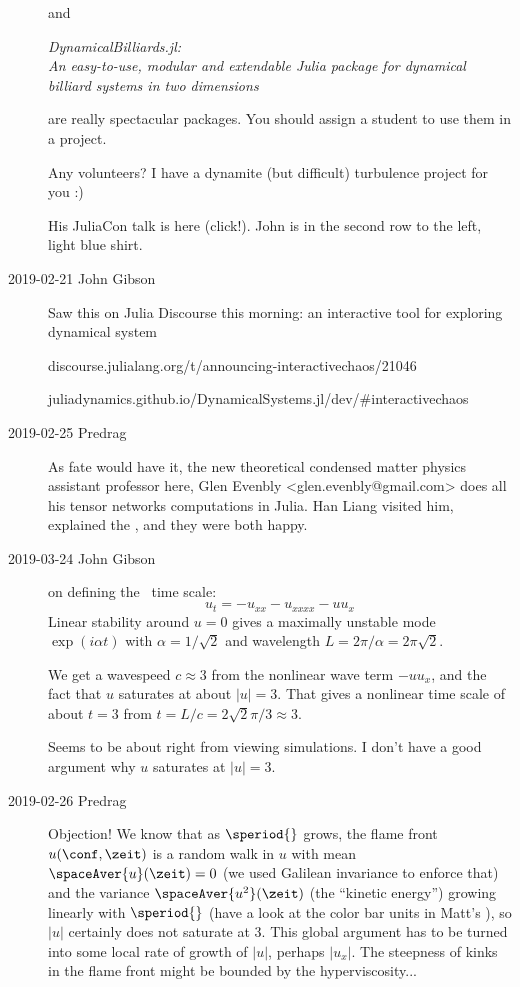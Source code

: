 \begin{description}
and

{\em {DynamicalBilliards}.jl:\\ An easy-to-use, modular and extendable {Julia}
package for dynamical billiard systems in two dimensions}

are really spectacular packages. You should assign a student to use them in a
project.

Any volunteers? I have a dynamite (but difficult) turbulence project for you :)

His JuliaCon talk is here
(click!).
John is in the second row to the left, light blue shirt.

    \item[2019-02-21 John Gibson]
Saw this on Julia Discourse this morning: an interactive tool for
exploring dynamical system

{discourse.julialang.org/t/announcing-interactivechaos/21046}

{juliadynamics.github.io/DynamicalSystems.jl/dev/\#interactivechaos}

    \item[2019-02-25 Predrag]
As fate would have it, the new theoretical condensed matter physics
assistant professor here,
 {Glen Evenbly}
<glen.evenbly@gmail.com>
does all his tensor networks computations in Julia. Han Liang
visited him, explained the \catlatt, and they were both happy.

    \item[2019-03-24 John Gibson] on defining the \KS\ time scale:
\[
u_t = - u_{xx} - u_{xxxx} - u u_x
\]
Linear stability around $u=0$ gives a maximally unstable mode
$\exp(i\alpha t)$ with $\alpha = 1/\sqrt{2}$ and
wavelength $L = 2\pi/\alpha = 2 \pi\sqrt{2}$.

We get a wavespeed $c \approx 3$ from the nonlinear wave term $-u u_x$,
and the fact that $u$ saturates at about $|u| = 3$.
That gives a nonlinear time scale of about $t=3$ from
$t = L/c = 2 \sqrt{2} \pi / 3 \approx 3$.

Seems to be about right from viewing simulations. I don't have a good
argument why $u$ saturates at  $|u| = 3$.

    \item[2019-02-26 Predrag]
Objection! We know that as $\speriod{}$ grows, the flame front
$u(\conf,\zeit)$ is a random walk in $u$ with mean
$\spaceAver{u}(\zeit)=0$ (we used Galilean invariance to enforce that)
and the variance $\spaceAver{u^2}(\zeit)$ (the ``kinetic energy'') growing
linearly with $\speriod{}$ (have a look at the color bar units in Matt's
\twots), so $|u|$ certainly does not saturate at 3. This global argument
has to be turned into some local rate of growth of $|u|$, perhaps
$|u_x|$. The steepness of kinks in the flame front might be bounded by
the hyperviscosity...


\end{description}

